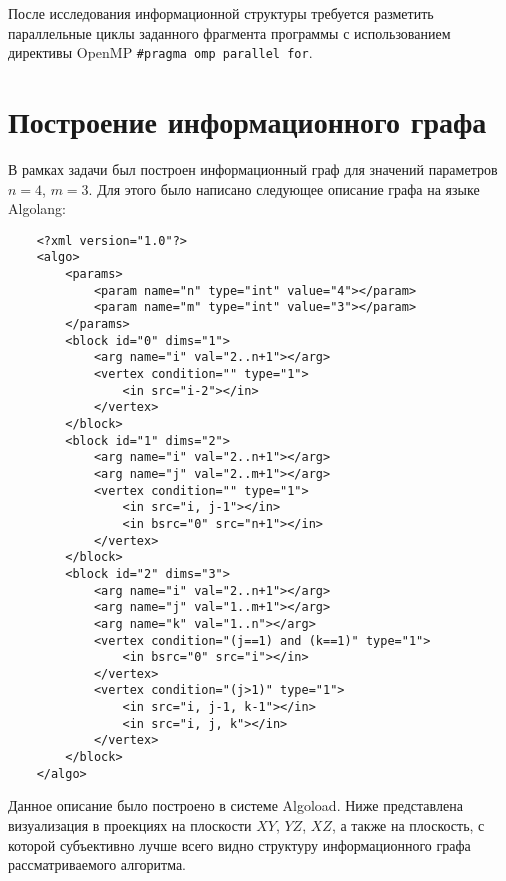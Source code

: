     После исследования информационной структуры требуется разметить параллельные циклы заданного фрагмента программы с использованием директивы OpenMP \texttt{\#pragma omp parallel for}.

    
    \section{Построение информационного графа}
    В рамках задачи был построен информационный граф для значений параметров $n=4$, $m=3$.
    Для этого было написано следующее описание графа на языке Algolang:
    \begin{verbatim}
    <?xml version="1.0"?>
    <algo>
        <params>
            <param name="n" type="int" value="4"></param>
            <param name="m" type="int" value="3"></param>
        </params>
        <block id="0" dims="1">
            <arg name="i" val="2..n+1"></arg>
            <vertex condition="" type="1">
                <in src="i-2"></in>
            </vertex>
        </block>
        <block id="1" dims="2">
            <arg name="i" val="2..n+1"></arg>
            <arg name="j" val="2..m+1"></arg>
            <vertex condition="" type="1">
                <in src="i, j-1"></in>
                <in bsrc="0" src="n+1"></in>
            </vertex>
        </block>
        <block id="2" dims="3">
            <arg name="i" val="2..n+1"></arg>
            <arg name="j" val="1..m+1"></arg>
            <arg name="k" val="1..n"></arg>
            <vertex condition="(j==1) and (k==1)" type="1">
                <in bsrc="0" src="i"></in>
            </vertex>
            <vertex condition="(j>1)" type="1">
                <in src="i, j-1, k-1"></in>
                <in src="i, j, k"></in>
            </vertex>
        </block>
    </algo>
    \end{verbatim}

    Данное описание было построено в системе Algoload.
    Ниже представлена визуализация в проекциях на плоскости $XY$, $YZ$, $XZ$, а также на плоскость, с которой субъективно лучше всего видно структуру информационного графа рассматриваемого алгоритма.

